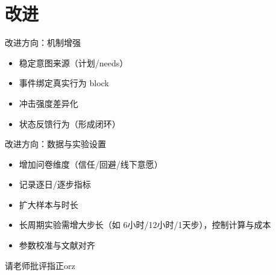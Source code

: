 \documentclass[aspectratio=169]{beamer}
\begin{document}
\section{改进}

\begin{frame}{改进方向：机制增强}
    \begin{itemize}
        \item 稳定意图来源（计划/needs）
        \item 事件绑定真实行为 block
        \item 冲击强度差异化
        \item 状态反馈行为（形成闭环）
    \end{itemize}

\end{frame}

\begin{frame}{改进方向：数据与实验设置}
    \begin{itemize}
        \item 增加问卷维度（信任/回避/线下意愿）
        \item 记录逐日/逐步指标
        \item 扩大样本与时长
        \item 长周期实验需增大步长（如 6小时/12小时/1天步），控制计算与成本
        \item 参数校准与文献对齐
    \end{itemize}

\end{frame}

\begin{frame}
    \centering
    \Huge{请老师批评指正orz}
\end{frame}
\end{document}
